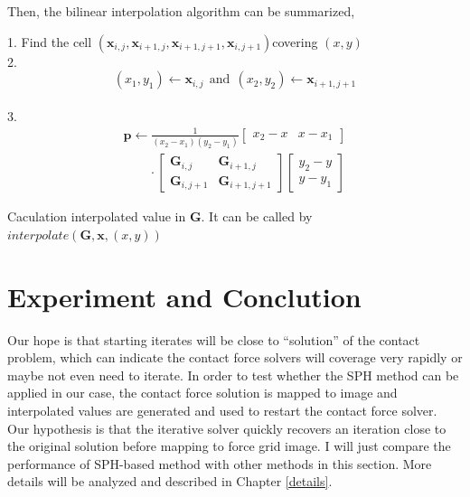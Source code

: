     Then, the bilinear interpolation algorithm can be summarized,
    \begin{algorithm}[!h]
        {
            1. Find the cell $(\mathbf{x}_{i, j}, \mathbf{x}_{i+1, j}, \mathbf{x}_{i+1, j+1}, \mathbf{x}_{i, j+1})$covering $(x, y)$ \\
            2. $$(x_1, y_1) \gets \mathbf{x}_{i, j}~~\text{and}~~(x_2, y_2)\gets\mathbf{x}_{i+1, j+1}$$ \\
            3. \begin{equation*}\begin{aligned}\pmb{p}\gets{\frac{1}{(x_{2}-x_{1})(y_{2}-y_{1})}}{\begin{bmatrix}x_{2}-x&x-x_{1}\end{bmatrix}}\\\qquad \cdot{\begin{bmatrix}\pmb{G}_{i, j}&\pmb{G}_{i+1, j}\\\pmb{G}_{i, j+1}&\pmb{G}_{i+1, j+1}\end{bmatrix}}{\begin{bmatrix}y_{2}-y\\y-y_{1}\end{bmatrix}}\end{aligned}\end{equation*}
        }
        \caption{Caculation interpolated value in $\pmb{G}$. It can be called by $interpolate(\pmb{G}, \mathbf{x}, (x, y))$}
        \label{interpolation}
    \end{algorithm}


\section{Experiment and Conclution}
    \label{sec:sph-exp}
    Our hope is that starting iterates will be close to ``solution'' of the contact problem, which can indicate the contact force solvers will coverage very rapidly or maybe not even need to iterate. In order to test whether the SPH method can be applied in our case, the contact force solution is mapped to image and interpolated values are generated and used to restart the contact force solver. Our hypothesis is that the iterative solver quickly recovers an iteration close to the original solution before mapping to force grid image. I will just compare the performance of SPH-based method with other methods in this section. More details will be analyzed and described in Chapter \ref{details}.

